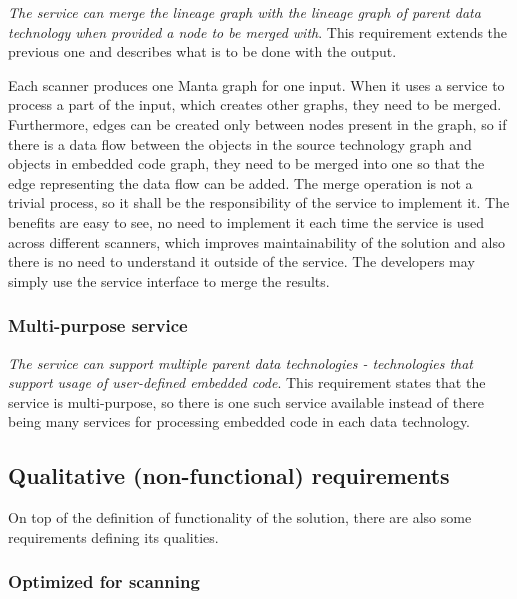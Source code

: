 \textit{The service can merge the lineage graph with the lineage graph of parent data technology when provided a node to be merged with}. This requirement extends the previous one and describes what is to be done with the output.
\par
Each scanner produces one Manta graph for one input. When it uses a service to process a part of the input, which creates other graphs, they need to be merged. Furthermore, edges can be created only between nodes present in the graph, so if there is a data flow between the objects in the source technology graph and objects in embedded code graph, they need to be merged into one so that the edge representing the data flow can be added. The merge operation is not a trivial process, so it shall be the responsibility of the service to implement it. The benefits are easy to see, no need to implement it each time the service is used across different scanners, which improves maintainability of the solution and also there is no need to understand it outside of the service. The developers may simply use the service interface to merge the results.

\subsubsection{Multi-purpose service}

\textit{The service can support multiple parent data technologies - technologies that support usage of user-defined embedded code}. This requirement states that the service is multi-purpose, so there is one such service available instead of there being many services for processing embedded code in each data technology.

\subsection{Qualitative (non-functional) requirements}

On top of the definition of functionality of the solution, there are also some requirements defining its qualities.

\subsubsection{Optimized for scanning}

